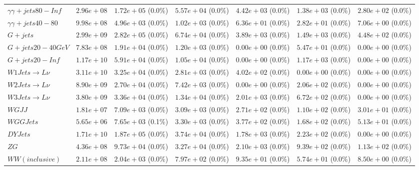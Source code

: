 \begin{landscape}
\begin{table}[h!]
\begin{tabular}{ |l|c|c|c|c|c|c| }
              $\gamma\gamma + jets 80-Inf$ &  $2.96e+08$ &   $1.72e+05$ (0.0\%) &  $5.57e+04$ (0.0\%) &  $4.42e+03$ (0.0\%) &    $1.38e+03$ (0.0\%) &    $2.80e+02$ (0.0\%) \\
               $\gamma\gamma + jets 40-80$ &  $9.98e+08$ &   $4.96e+03$ (0.0\%) &  $1.02e+03$ (0.0\%) &  $6.36e+01$ (0.0\%) &    $2.82e+01$ (0.0\%) &    $7.06e+00$ (0.0\%) \\
                                  $G+jets$ &  $2.99e+09$ &   $2.82e+05$ (0.0\%) &  $6.74e+04$ (0.0\%) &  $3.89e+03$ (0.0\%) &    $1.49e+03$ (0.0\%) &    $4.48e+02$ (0.0\%) \\
                         $G+jets 20-40GeV$ &  $7.83e+08$ &   $1.91e+04$ (0.0\%) &  $1.20e+03$ (0.0\%) &  $0.00e+00$ (0.0\%) &    $5.47e+01$ (0.0\%) &    $0.00e+00$ (0.0\%) \\
                           $G+jets 20-Inf$ &  $1.17e+10$ &   $5.91e+04$ (0.0\%) &  $1.05e+04$ (0.0\%) &  $0.00e+00$ (0.0\%) &    $1.17e+03$ (0.0\%) &    $0.00e+00$ (0.0\%) \\
                 $W1Jets \rightarrow L\nu$ &  $3.11e+10$ &   $3.25e+04$ (0.0\%) &  $2.81e+03$ (0.0\%) &  $4.02e+02$ (0.0\%) &    $0.00e+00$ (0.0\%) &    $0.00e+00$ (0.0\%) \\
                 $W2Jets \rightarrow L\nu$ &  $8.90e+09$ &   $2.70e+04$ (0.0\%) &  $7.42e+03$ (0.0\%) &  $0.00e+00$ (0.0\%) &    $2.06e+02$ (0.0\%) &    $0.00e+00$ (0.0\%) \\
                 $W3Jets \rightarrow L\nu$ &  $3.80e+09$ &   $3.36e+04$ (0.0\%) &  $1.34e+04$ (0.0\%) &  $2.01e+03$ (0.0\%) &    $6.72e+02$ (0.0\%) &    $0.00e+00$ (0.0\%) \\
                                    $WGJJ$ &  $1.81e+07$ &   $7.09e+03$ (0.0\%) &  $3.09e+03$ (0.0\%) &  $2.71e+02$ (0.0\%) &    $1.10e+02$ (0.0\%) &    $3.01e+01$ (0.0\%) \\
                                 $WGGJets$ &  $5.65e+06$ &   $7.65e+03$ (0.1\%) &  $3.30e+03$ (0.0\%) &  $3.77e+02$ (0.0\%) &    $1.68e+02$ (0.0\%) &    $5.13e+01$ (0.0\%) \\
                                  $DYJets$ &  $1.71e+10$ &   $1.87e+05$ (0.0\%) &  $3.74e+04$ (0.0\%) &  $1.78e+03$ (0.0\%) &    $2.23e+02$ (0.0\%) &    $0.00e+00$ (0.0\%) \\
                                      $ZG$ &  $4.36e+08$ &   $9.73e+04$ (0.0\%) &  $3.27e+04$ (0.0\%) &  $2.10e+03$ (0.0\%) &    $9.39e+02$ (0.0\%) &    $1.13e+02$ (0.0\%) \\
                           $WW(inclusive)$ &  $2.11e+08$ &   $2.04e+03$ (0.0\%) &  $7.97e+02$ (0.0\%) &  $9.35e+01$ (0.0\%) &    $5.74e+01$ (0.0\%) &    $8.50e+00$ (0.0\%) \\

\end{tabular}
\end{table}
\end{landscape}
